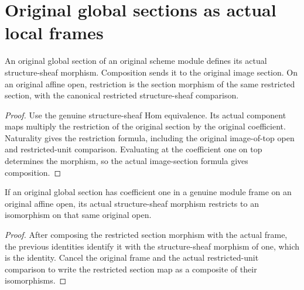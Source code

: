 \section{Original global sections as actual local frames}

\begin{lemma}
\label{lem:scheme-original-global-section-hom}
\leanok
An original global section of an original scheme module defines its actual
structure-sheaf morphism. Composition sends it to the original image section.
On an original affine open, restriction is the section morphism of the same
restricted section, with the canonical restricted structure-sheaf comparison.
\end{lemma}
\begin{proof}
Use the genuine structure-sheaf Hom equivalence. Its actual component maps
multiply the restriction of the original section by the original coefficient.
Naturality gives the restriction formula, including the original image-of-top
open and restricted-unit comparison. Evaluating at the coefficient one on top
determines the morphism, so the actual image-section formula gives composition.
\end{proof}

\begin{lemma}
\label{lem:scheme-original-coefficient-one-section-frame}
\leanok
If an original global section has coefficient one in a genuine module frame
on an original affine open, its actual structure-sheaf morphism restricts to
an isomorphism on that same original open.
\end{lemma}
\begin{proof}
After composing the restricted section morphism with the actual frame, the
previous identities identify it with the structure-sheaf morphism of one,
which is the identity. Cancel the original frame and the actual restricted-unit
comparison to write the restricted section map as a composite of their
isomorphisms.
\end{proof}

